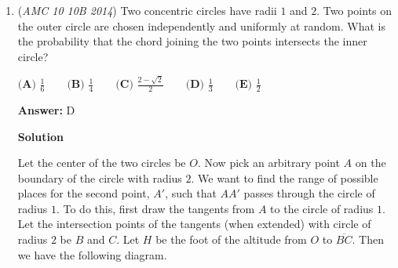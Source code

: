 \begin{enumerate}
 \textbf{Answer: }E



\textbf{Solution 1}

We start off with the fact that the median is $9$, so we must have $a, b, c, d, e, 9, f, g, h, i, j$, listed in ascending order. Note that the integers do not have to be distinct. 

 Since the mode is $8$, we have to have at least $2$ occurrences of $8$ in the list. If there are $2$ occurrences of $8$ in the list, we will have $a, b, c, 8, 8, 9, f, g, h, i, j$. In this case, since $8$ is the unique mode, the rest of the integers have to be distinct. So we minimize $a,b,c,f,g,h,i$ in order to maximize $j$. If we let the list be $1,2,3,8,8,9,10,11,12,13,j$, then $j = 11 \times 10 - (1+2+3+8+8+9+10+11+12+13) = 33$. 

 Next, consider the case where there are $3$ occurrences of $8$ in the list. Now, we can have two occurrences of another integer in the list. We try $1,1,8,8,8,9,9,10,10,11,j$. Following the same process as above, we get $j = 11 \times 10 - (1+1+8+8+8+9+9+10+10+11) = 35$. As this is the highest choice in the list, we know this is our answer. Therefore, the answer is $\boxed{\textbf{(E) }35}$




\textbf{Solution 2}

Note that $x_1 + \ldots + x_{11} = 110$ let $x_6 = 9$ so $x_1 + \ldots + x_5 + x_7 + \ldots + x_{11} = 101$. To maximize the value of $x_i$ where $i$ ranges from $1$ to $11$, we let any $7$ elements be $1,2,\ldots,7$ so $x_1 + x_2 + x_3 = 57$. Now we have to let one of above $3$ values = $8$ hence $x_1 + x_2 = 49$ now let $x_1 = 35$, $x_2 = 14$ hence $\boxed{\textbf{(E) }35}$ is the answer.

 


	\item (\textit{AMC 10 10B 2014}) Two concentric circles have radii $1$ and $2$. Two points on the outer circle are chosen independently and uniformly at random. What is the probability that the chord joining the two points intersects the inner circle?


 $\textbf{(A) }\frac{1}{6}\qquad\textbf{(B) }\frac{1}{4}\qquad\textbf{(C) }\frac{2-\sqrt{2}}{2}\qquad\textbf{(D) }\frac{1}{3}\qquad\textbf{(E) }\frac{1}{2}\qquad$

 \textbf{Answer: }D



\textbf{Solution}

Let the center of the two circles be $O$. Now pick an arbitrary point $A$ on the boundary of the circle with radius $2$. We want to find the range of possible places for the second point, $A'$, such that $AA'$ passes through the circle of radius $1$. To do this, first draw the tangents from $A$ to the circle of radius $1$. Let the intersection points of the tangents (when extended) with circle of radius $2$ be $B$ and $C$. Let $H$ be the foot of the altitude from $O$ to $\overline{BC}$. Then we have the following diagram.


\end{enumerate}
